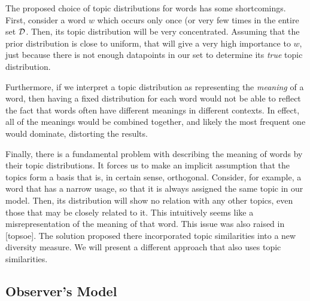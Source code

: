 \documentclass{article} %
\begin{document}
The proposed choice of topic distributions for words has some
shortcomings. First, consider a word $w$ which occurs only once (or very
few times in the entire set ${\mathcal D}$. Then, its topic distribution will be
very concentrated. Assuming that the prior distribution is close to
uniform, that will give a very high importance to $w$, just because
there is not enough datapoints in our set to determine its {\em true}
topic distribution. 

Furthermore, if we interpret a topic distribution as representing the
{\em meaning} of a word, then having a fixed distribution for each
word would not be able to reflect the fact that words often have
different meanings in different contexts. In effect, all of the
meanings would be combined together, and likely the most frequent one
would dominate, distorting the results.

Finally, there is a fundamental problem with describing the meaning of
words by their topic distributions. It forces us to make an implicit
assumption that the topics form a basis that is, in certain sense,
orthogonal. Consider, for example, a word that has a narrow usage, so
that it is always assigned the same topic in our model. Then, its
distribution will show no relation with any other topics, even those
that may be closely related to it. This intuitively seems like a
misrepresentation of the meaning of that word. This issue was also
raised in [topsoe]. The solution proposed there incorporated topic
similarities into a new diversity measure. We will present a different
approach that also uses topic similarities.


\subsection{Observer's Model}
\label{sec:observer-model}
\end{document}
